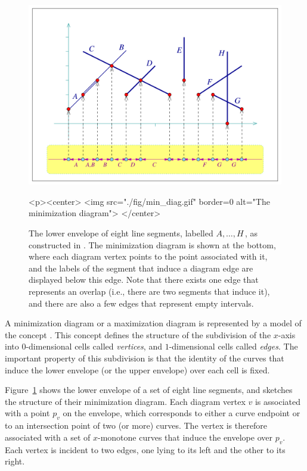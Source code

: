 \begin{figure}[t]
\begin{ccTexOnly}
  \begin{center}
    \includegraphics[width=5in]{Envelope_2/fig/min_diag}
  \end{center}
\end{ccTexOnly}
\begin{ccHtmlOnly}
  <p><center>
  <img src="./fig/min_diag.gif" border=0 alt="The minimization diagram">
  </center>
\end{ccHtmlOnly}
\caption{The lower envelope of eight line segments, labelled
$A, \ldots, H$\,, as constructed in .
The minimization diagram is shown at the bottom, where
each diagram vertex points to the point associated with it, and the
labels of the segment that induce a diagram edge are displayed below
this edge. Note that there exists one edge that represents an overlap
(i.e., there are two segments that induce it), and there are also a 
few edges that represent empty intervals.\label{env2_fig:min_diag}}
\end{figure}

A minimization diagram or a maximization diagram is represented by
a model of the concept . This concept defines
the structure of the subdivision of the $x$-axis into $0$-dimensional
cells called {\em vertices}, and $1$-dimensional cells called {\em edges}.
The important property of this subdivision is that the identity of
the curves that induce the lower envelope (or the upper envelope)
over each cell is fixed.

Figure~\ref{env2_fig:min_diag} shows the lower envelope of a set of
eight line segments, and sketches the structure of their minimization
diagram. Each diagram vertex $v$ is associated with a point $p_v$ on
the envelope, which corresponds to either a curve endpoint
or to an intersection point of two (or more) curves. The vertex is
therefore associated with a set of $x$-monotone curves that induce the
envelope over $p_v$. Each vertex is incident to two edges, one lying
to its left and the other to its right.

